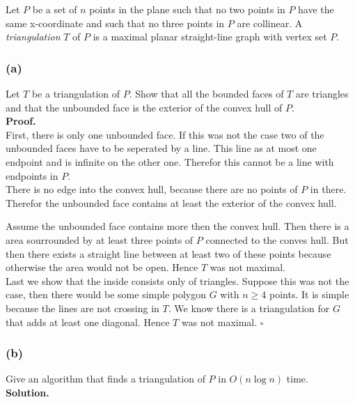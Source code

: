 \documentclass[11pt,a4paper,ngerman]{article}
\begin{document}
Let $P$ be a set of $n$ points in the plane such that no two points in $P$ have the same x-coordinate
and such that no three points in $P$ are collinear. A \emph{triangulation} $T$ of $P$ is a maximal planar
straight-line graph with vertex set $P$.

\subsubsection*{(a)}

Let $T$ be a triangulation of $P$. Show that all the bounded faces of $T$ are triangles and that 
the unbounded face is the exterior of the convex hull of $P$.\\

\textbf{Proof.}\\

First, there is only one unbounded face. If this was not the case two of the unbounded
faces have to be seperated by a line. This line as at most one endpoint and is infinite
on the other one. Therefor this cannot be a line with endpoints in $P$.\\

There is no edge into the convex hull, because there are no points of $P$ in there. Therefor
the unbounded face contains at least the exterior of the convex hull.

Assume the unbounded face contains more then the convex hull. Then there is a area sourrounded by
at least three points of $P$ connected to the conves hull. But then there exists a straight line
between at least two of these points because otherwise the area would not be open. Hence $T$ was
not maximal.\\

Last we show that the inside consists only of triangles. Suppose this was not the case,
then there would be some simple polygon $G$ with $n \geq 4$ points. It is simple because
the lines are not crossing in $T$. We know there is a triangulation for $G$ that adds at least one
diagonal. Hence $T$ was not maximal.
\mbox{}\hfill $\square$

\subsubsection*{(b)}

Give an algorithm that finds a triangulation of $P$ in $O(n \log n)$ time.\\

\textbf{Solution.}\\
\end{document}
